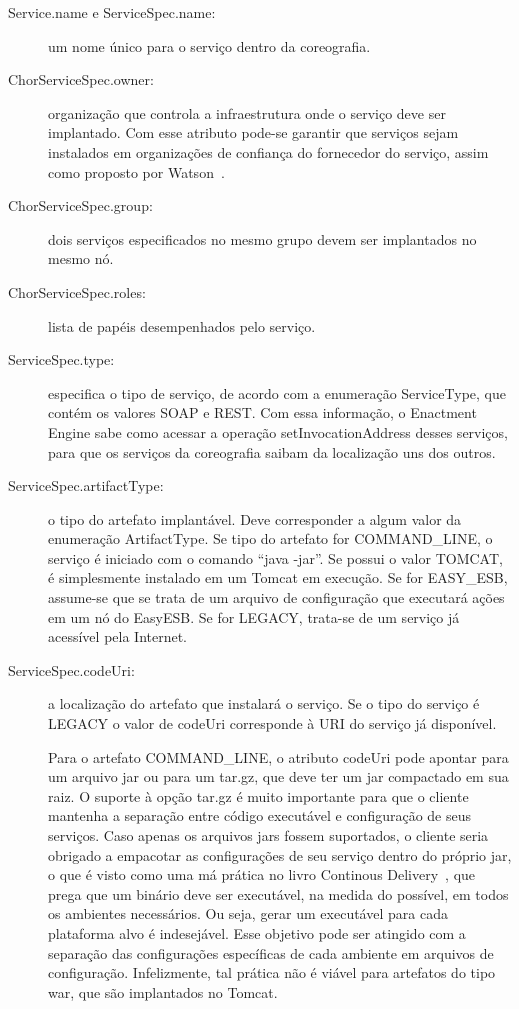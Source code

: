 \begin{description}

\item [Service.name e ServiceSpec.name:] um nome único para o serviço dentro da coreografia.

\item [ChorServiceSpec.owner:] organização que controla a infraestrutura onde o serviço deve ser implantado. Com esse atributo pode-se garantir que serviços sejam instalados em organizações de confiança do fornecedor do serviço, assim como proposto por Watson~\cite{Watson2006Dynasoar}.

\item [ChorServiceSpec.group:] dois serviços especificados no mesmo grupo devem ser implantados no mesmo nó.

\item [ChorServiceSpec.roles:] lista de papéis desempenhados pelo serviço.

\item [ServiceSpec.type:] especifica o tipo de serviço, de acordo com a enumeração ServiceType, que contém os valores SOAP e REST. Com essa informação, o Enactment Engine sabe como acessar a operação setInvocationAddress desses serviços, para que os serviços da coreografia saibam da localização uns dos outros. 

\item [ServiceSpec.artifactType:] o tipo do artefato implantável. Deve corresponder a algum valor da enumeração ArtifactType. Se tipo do artefato for COMMAND\_LINE, o serviço é iniciado com o comando ``java -jar''. Se possui o valor TOMCAT, é simplesmente instalado em um Tomcat em execução. Se for EASY\_ESB, assume-se que se trata de um arquivo de configuração que executará ações em um nó do EasyESB. Se for LEGACY, trata-se de um serviço já acessível pela Internet.

\item [ServiceSpec.codeUri:] a localização do artefato que instalará o serviço. Se o tipo do serviço é LEGACY o valor de codeUri corresponde à URI do serviço já disponível.

Para o artefato COMMAND\_LINE, o atributo codeUri pode apontar para um arquivo jar ou para um tar.gz, que deve ter um jar compactado em sua raiz. O suporte à opção tar.gz é muito importante para que o cliente mantenha a separação entre código executável e configuração de seus serviços. Caso apenas os arquivos jars fossem suportados, o cliente seria obrigado a empacotar as configurações de seu serviço dentro do próprio jar, o que é visto como uma má prática no livro Continous Delivery~\cite{Humble2011Continuous}, que prega que um binário deve ser executável, na medida do possível, em todos os ambientes necessários. Ou seja, gerar um executável para cada plataforma alvo é indesejável. Esse objetivo pode ser atingido com a separação das configurações específicas de cada ambiente em arquivos de configuração. Infelizmente, tal prática não é viável para artefatos do tipo war, que são implantados no Tomcat.


\end{description}
